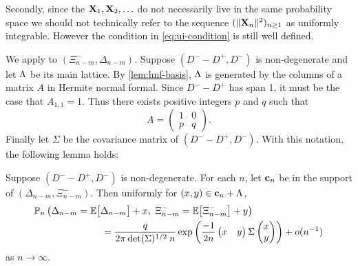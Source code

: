 Secondly, since the ${\mathbf X}_1, {\mathbf X}_2, \ldots$ do not necessarily live in the same probability space we should not technically refer to the sequence $(\lVert{\mathbf X}_n\rVert^2)_{n \geq 1}$ as uniformly integrable. However the condition in \cref{eq:ui-condition} is still well defined.

We apply  to $(\Xi_{n-m}^-, \Delta_{n-m})$. Suppose $(D^- - D^+, D^-)$ is non-degenerate and let $\Lambda$ be its main lattice. By \cref{lem:hnf-basis}, $\Lambda$ is generated by the columns of a matrix $A$ in Hermite normal formal. Since $D^- - D^+$ has span 1, it must be the case that $A_{1, 1} = 1$. Thus there exists positive integers $p$ and $q$ such that
\begin{equation*}
    A = \begin{pmatrix}
        1 & 0 \\ 
        p & q
    \end{pmatrix}.
\end{equation*}
Finally let $\Sigma$ be the covariance matrix of $(D^- - D^+, D^-)$. With this notation, the following lemma holds:
\begin{lemma}
    \label{lem:bivar-llt}
    Suppose $(D^- - D^+, D^-)$ is non-degenerate. For each $n$, let ${\mathbf c}_n$ be in the support of $(\Delta_{n-m}, \Xi^-_{n-m})$. Then uniformly for $(x, y) \in {\mathbf c}_n + \Lambda$,
    \begin{align*}
        &\P_n\left(
            \Delta_{n-m} = \E \big[ \Delta_{n-m} \big] + x, \ 
            \Xi^-_{n-m} = \E \big[ \Xi^-_{n-m} \big] + y
        \right)  \nonumber \\
        &\hspace{7em} = \frac{q}{2\pi \det(\Sigma)^{1/2} \: n} \exp\left( 
            \frac{-1}{2n}
            \begin{pmatrix}
                x & y
            \end{pmatrix}
            \Sigma
            \begin{pmatrix}
                x \\ y
            \end{pmatrix}
        \right)
        + \littleo( n^{-1} )
    \end{align*}
    as $n \to \infty$.
\end{lemma}
